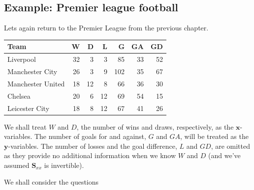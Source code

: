 \documentclass[]{book}
\newenvironment{Shaded}{\begin{snugshade}}{\end{snugshade}}
\newcommand{\CommentTok}[1]{\textcolor[rgb]{0.56,0.35,0.01}{\textit{#1}}}
\newcommand{\DataTypeTok}[1]{\textcolor[rgb]{0.13,0.29,0.53}{#1}}
\newcommand{\DecValTok}[1]{\textcolor[rgb]{0.00,0.00,0.81}{#1}}
\newcommand{\KeywordTok}[1]{\textcolor[rgb]{0.13,0.29,0.53}{\textbf{#1}}}
\newcommand{\NormalTok}[1]{#1}
\newcommand{\OperatorTok}[1]{\textcolor[rgb]{0.81,0.36,0.00}{\textbf{#1}}}
\newcommand{\OtherTok}[1]{\textcolor[rgb]{0.56,0.35,0.01}{#1}}
\newcommand{\StringTok}[1]{\textcolor[rgb]{0.31,0.60,0.02}{#1}}
\theoremstyle{definition}
\theoremstyle{definition}
\theoremstyle{definition}
\theoremstyle{remark}
\begin{document}
\hypertarget{example-premier-league-football}{%
\subsection{Example: Premier league football}\label{example-premier-league-football}}

Lets again return to the Premier League from the previous chapter.

\begin{Shaded}
\end{Shaded}

\begin{tabular}{lrrrrrr}
\toprule
Team & W & D & L & G & GA & GD\\
\midrule
Liverpool & 32 & 3 & 3 & 85 & 33 & 52\\
Manchester City & 26 & 3 & 9 & 102 & 35 & 67\\
Manchester United & 18 & 12 & 8 & 66 & 36 & 30\\
Chelsea & 20 & 6 & 12 & 69 & 54 & 15\\
Leicester City & 18 & 8 & 12 & 67 & 41 & 26\\
\bottomrule
\end{tabular}

We shall treat \(W\) and \(D\), the number of wins and draws, respectively, as the \(\boldsymbol x\)-variables. The number of goals for and against, \(G\) and \(GA\), will be treated as the \(\boldsymbol y\)-variables. The number of losses and the goal difference, \(L\) and \(GD\), are omitted as they provide no additional information when we know \(W\) and \(D\) (and we've assumed \(\boldsymbol S_{xx}\) is invertible).

We shall consider the questions
\end{document}
